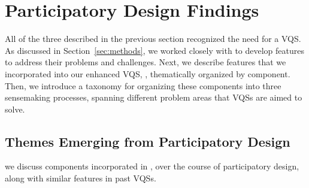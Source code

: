 \section{Participatory Design Findings\label{sec:pd_findings}}
All of the three  described in the previous section recognized the need for a VQS. As discussed in Section~\ref{sec:methods}, we worked closely with  to develop features to address their problems and challenges. Next, we describe features that we incorporated into our enhanced VQS, \zvpp, thematically organized by component. Then, we introduce a taxonomy for organizing these components into three sensemaking processes, spanning different problem areas that VQSs are aimed to solve. 
\subsection{Themes Emerging from Participatory Design\label{sec:pd_findings}}
 we discuss components 
incorporated in \zvpp, over the course of participatory design, 
along with similar features in past VQSs.

